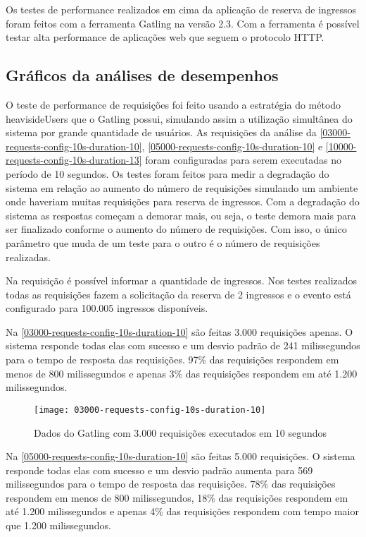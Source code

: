 Os testes de performance realizados em cima da aplicação de reserva de ingressos foram
feitos com a ferramenta Gatling na versão 2.3.
Com a ferramenta é possível testar alta performance de aplicações web
\cite{gatling-docs} que seguem o protocolo HTTP.

\subsection{Gráficos da análises de desempenhos}

O teste de performance de requisições foi feito usando a
estratégia do método heavisideUsers \cite{gatling-simulation-setup}
que o Gatling possui, simulando assim a utilização simultânea do sistema por
grande quantidade de usuários.
As requisições da análise da
\autoref{03000-requests-config-10s-duration-10},
\autoref{05000-requests-config-10s-duration-10}
e \autoref{10000-requests-config-10s-duration-13}
foram configuradas para serem executadas no período de 10 segundos.
Os testes foram feitos para medir a degradação do sistema em relação ao aumento do
número de requisições simulando um ambiente onde haveriam muitas requisições para
reserva de ingressos.
Com a degradação do sistema as respostas começam a demorar mais, ou seja,
o teste demora mais para ser finalizado conforme o aumento do número de requisições.
Com isso, o único parâmetro que muda de um teste para o outro
é o número de requisições realizadas.

Na requisição é possível informar a quantidade de ingressos.
Nos testes realizados todas as requisições fazem a solicitação da reserva de
2 ingressos e o evento está configurado para 100.005 ingressos disponíveis.

Na \autoref{03000-requests-config-10s-duration-10} são feitas 3.000 requisições apenas.
O sistema responde todas elas com sucesso e um desvio padrão de 241 milissegundos
para o tempo de resposta das requisições.
97\% das requisições respondem em menos de 800 milissegundos e apenas 3\% das requisições
respondem em até 1.200 milissegundos.

\begin{figure}[h]
  \texttt{[image: 03000-requests-config-10s-duration-10]}
  \caption{Dados do Gatling com 3.000 requisições executados em 10 segundos}
  \label{03000-requests-config-10s-duration-10}
\end{figure}

Na \autoref{05000-requests-config-10s-duration-10} são feitas 5.000 requisições.
O sistema responde todas elas com sucesso e um desvio padrão aumenta para 569 milissegundos
para o tempo de resposta das requisições.
78\% das requisições respondem em menos de 800 milissegundos, 18\% das requisições
respondem em até 1.200 milissegundos e apenas 4\% das requisições
respondem com tempo maior que 1.200 milissegundos.

